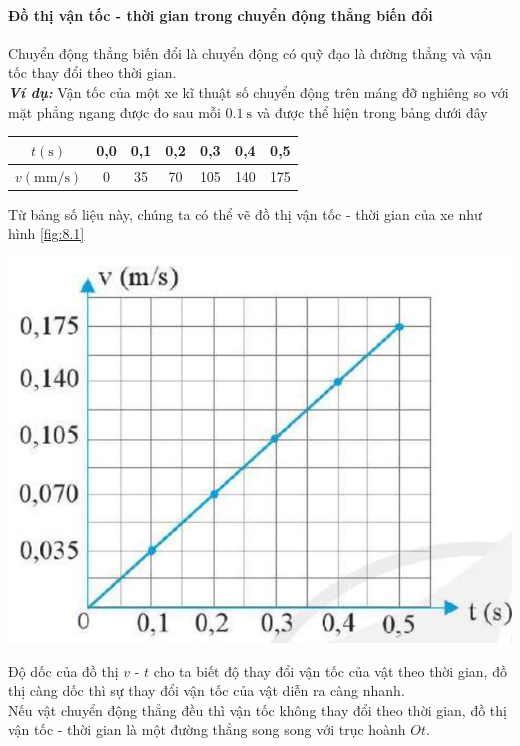 \begin{tomtat}
	\paragraph{Đồ thị vận tốc - thời gian trong chuyển động thẳng biến đổi}
	Chuyển động thẳng biến đổi là chuyển động có quỹ đạo là đường thẳng và vận tốc thay đổi theo thời gian.\\
	\textbf{\textit{Ví dụ:}} Vận tốc của một xe kĩ thuật số chuyển động trên máng đỡ nghiêng so với mặt phẳng ngang được đo sau mỗi $\SI{0.1}{\second}$ và được thể hiện trong bảng dưới đây
	\begin{center}
		\begin{tabular}{|c|c|c|c|c|c|c|}
			\hline
			$t \left(\si{\second}\right)$ & 0,0 & 0,1 & 0,2 & 0,3 & 0,4 & 0,5\\
			\hline
			$v \left(\si{\milli\meter/\second}\right)$& 0 & 35 & 70 & 105 & 140 & 175\\
			\hline
		\end{tabular}
	\end{center}
	Từ bảng số liệu này, chúng ta có thể vẽ đồ thị vận tốc - thời gian của xe như hình \ref{fig:8.1}
	\begin{center}
		\includegraphics[scale=0.5]{figs/G10Y25B6-4}
		\label{fig:8.1}
	\end{center}
	Độ dốc của đồ thị $v$ - $t$ cho ta biết độ thay đổi vận tốc của vật theo thời gian, đồ thị càng dốc thì sự thay đổi vận tốc của vật diễn ra càng nhanh.\\
	Nếu vật chuyển động thẳng đều thì vận tốc không thay đổi theo thời gian, đồ thị vận tốc - thời gian là một đường thẳng song song với trục hoành $Ot$.

\end{tomtat}
